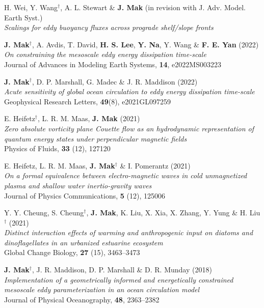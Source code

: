 \documentclass[letterpaper]{article}
\renewenvironment{itemize}{
  \begin{list}{}{
    \setlength{\leftmargin}{1.5em}
  }
}{
  \end{list}
}
\begin{document}
\begin{itemize}
\item[*] H. Wei, Y. Wang$^{\dagger}$, A. L. Stewart \& \textbf{J. Mak}
(in revision with J. Adv. Model. Earth Syst.)\\
\textit{Scalings for eddy buoyancy fluxes across prograde shelf/slope fronts}

\item[14.] \textbf{J. Mak}$^{\dagger}$, A. Avdis, T. David, \textbf{H. S. Lee}, \textbf{Y. Na}, Y. Wang \& \textbf{F. E. Yan} (2022)\\
\textit{On constraining the mesoscale eddy energy dissipation time-scale}\\
Journal of Advances in Modeling Earth Systems, \textbf{14}, e2022MS003223

\item[13.] \textbf{J. Mak}$^{\dagger}$, D. P. Marshall, G. Madec \& J. R. Maddison (2022)\\
\textit{Acute sensitivity of global ocean circulation to eddy energy dissipation time-scale}\\
Geophysical Research Letters, \textbf{49}(8), e2021GL097259

\item[12.] E. Heifetz$^{\dagger}$, L. R. M. Maas, \textbf{J. Mak} (2021)\\
\textit{Zero absolute vorticity plane Couette flow as an hydrodynamic representation of quantum energy states under perpendicular magnetic fields}\\
Physics of Fluids, \textbf{33} (12), 127120

\item[11.] E. Heifetz, L. R. M. Maas, \textbf{J. Mak}$^{\dagger}$ \& I. Pomerantz (2021)\\
\textit{On a formal equivalence between electro-magnetic waves in cold unmagnetized plasma and shallow water inertio-gravity waves}\\
Journal of Physics Communications, \textbf{5} (12), 125006

\item[10.] Y. Y. Cheung, S. Cheung$^{\dagger}$, \textbf{J. Mak}, K. Liu, X. Xia, X. Zhang, Y. Yung \& H. Liu$^{\dagger}$ (2021)\\
\textit{Distinct interaction effects of warming and anthropogenic input on
diatoms and dinoflagellates in an urbanized estuarine ecosystem}\\
Global Change Biology, \textbf{27} (15), 3463--3473

\item[9.] \textbf{J. Mak}$^{\dagger}$, J. R. Maddison, D. P. Marshall \& D. R. Munday
(2018)\\
\textit{Implementation of a geometrically informed and energetically constrained
mesoscale eddy parameterization in an ocean circulation model}\\
Journal of Physical Oceanography, \textbf{48}, 2363--2382


\end{itemize}
\end{document}
